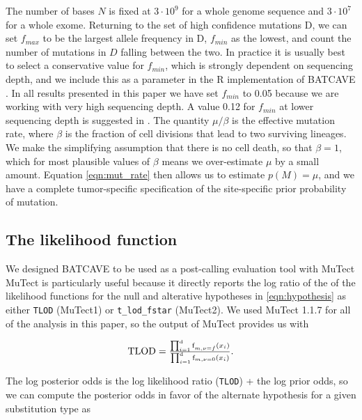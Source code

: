 \documentclass[a4,center,fleqn]{NAR}
\newcommand{\batcave}{BATCAVE }
\begin{document}
The number of bases $N$ is fixed at $3\cdot10^9$ for a whole genome sequence and $3\cdot10^7$ for a whole exome.
Returning to the set of high confidence mutations $\mathrm{D}$, we can set $f_{max}$ to be the largest allele frequency in $\mathrm{D}$, $f_{min}$ as the lowest, and count the number of mutations in $D$ falling between the two.
In practice it is usually best to select a conservative value for $f_{min}$, which is strongly dependent on sequencing depth, and we include this as a parameter in the R implementation of \batcave.
In all results presented in this paper we have set $f_{min}$ to 0.05 because we are working with very high sequencing depth.
A value 0.12 for $f_{min}$ at lower sequencing depth is suggested in \citet{Williams2016}.
The quantity $\mu/\beta$ is the effective mutation rate, where $\beta$ is the fraction of cell divisions that lead to two surviving lineages.
We make the simplifying assumption that there is no cell death, so that $\beta = 1$, which for most plausible values of $\beta$ means we over-estimate $\mu$ by a small amount.
Equation \ref{eqn:mut_rate} then allows us to estimate $p(M) = \mu$, and we have a complete tumor-specific specification of the site-specific prior probability of mutation.

\subsection{The likelihood function}
We designed \batcave to be used as a post-calling evaluation tool with MuTect
MuTect is particularly useful because it directly reports the log ratio of the of the likelihood functions for the null and alterative hypotheses in \ref{eqn:hypothesis} as either \texttt{TLOD} (MuTect1) or \texttt{t\_lod\_fstar} (MuTect2).
We used MuTect 1.1.7 for all of the analysis in this paper, so the output of MuTect provides us with

\begin{equation}
  \label{eqn:tlod}
    $$
    \mathrm{TLOD} = \frac{\prod_{i=1}^{\mathrm{d}} \textrm{f}_{m,\nu = \hat{f}}(x_i)}{\prod_{i=1}^{\mathrm{d}} \textrm{f}_{m,\nu = 0}(x_i)}.
    $$
\end{equation}

The log posterior odds is the log likelihood ratio (\texttt{TLOD}) + the log prior odds, so we can compute the posterior odds in favor of the alternate hypothesis for a given substitution type as
\end{document}
